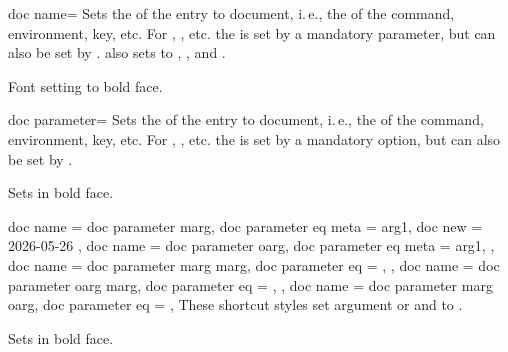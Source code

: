 \begin{docTcbKey}[][doc new={2020-04-22}]{doc name}{=}{\tcbdocdescInitEmpty}
  Sets the  of the entry to document, i.\,e., the  of the
  command, environment, key, etc. For , , etc.
  the  is set by a mandatory parameter, but can also be set
  by .
   also sets  to
  , ,
  and .
\begin{dispExample}
\begin{docCommands}[
    doc no index,  %
    doc name      = bfseries,
  ] {}
  Font setting to bold face.
\end{docCommands}
\end{dispExample}
\end{docTcbKey}


\begin{docTcbKey}[][doc new={2020-04-22}]{doc parameter}{=}{\tcbdocdescInitEmpty}
  Sets the  of the entry to document, i.\,e., the  of the
  command, environment, key, etc. For , , etc.
  the  is set by a mandatory option, but can also be set
  by .
\begin{dispExample}
\begin{docCommands}[
    doc no index,  %
    doc name      = textbf,
    doc parameter = \marg{text},
  ] {}
  Sets  in bold face.
\end{docCommands}
\end{dispExample}
\end{docTcbKey}


\begin{docTcbKeys}[doc description = style]
  {
    {
      doc name              = doc parameter marg,
      doc parameter eq meta = arg1,
      doc new  = 2026-05-26
    },
    {
      doc name              = doc parameter oarg,
      doc parameter eq meta = arg1,
    },
    {
      doc name         = doc parameter marg marg,
      doc parameter eq = ,
    },
    {
      doc name         = doc parameter oarg marg,
      doc parameter eq = ,
    },
    {
      doc name         = doc parameter marg oarg,
      doc parameter eq = ,
    }
  }
These shortcut styles set argument  or  and 
to .

\begin{dispExample}
\begin{docCommands}[
    doc no index,  %
    doc name           = textbf,
    doc parameter marg = text,
  ] {}
  Sets  in bold face.
\end{docCommands}
\end{dispExample}
\end{docTcbKeys}

